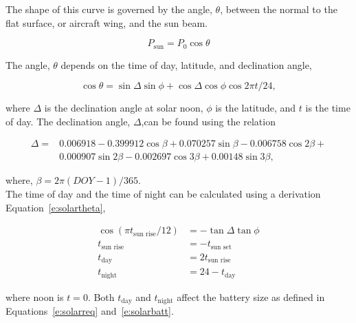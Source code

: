 \documentclass[]{aiaa-tc}%
\begin{document}
The shape of this curve is governed by the angle, $\theta$, between the normal to the flat surface, or aircraft wing, and the sun beam.\cite{solar}

\begin{equation}
    \label{e:solarp}
    P_{\text{sun}} = P_0 \cos{\theta}
\end{equation}

The angle, $\theta$ depends on the time of day, latitude, and declination angle,\cite{solar}

    \begin{equation}
        \label{e:solartheta}
        \cos{\theta} = \sin{\Delta} \sin{\phi} + \cos{\Delta} \cos{\phi} \cos{2\pi t/24},
    \end{equation}

    where $\Delta$ is the declination angle at solar noon, $\phi$ is the latitude, and $t$ is the time of day.\cite{solar}  The declination angle, $\Delta$,can be found using the relation\cite{solar} 

    \begin{align}
        \label{e:solardelta}
        \Delta = &0.006918 - 0.399912 \cos{\beta} + 0.070257\sin{\beta} - 0.006758\cos{2\beta} + \nonumber \\
        & 0.000907\sin{2\beta} - 0.002697\cos{3\beta} + 0.00148\sin{3\beta},
    \end{align}

    where, $\beta = 2\pi (DOY-1)/365$.  \\

    The time of day and the time of night can be calculated using a derivation Equation~\ref{e:solartheta}, \cite{solar}

    \begin{align}
        \label{e:solartday}
        \cos{(\pi t_{\text{sun rise}}/12)} &= -\tan{\Delta} \tan{\phi} \\
        \label{e:solarsunrise}
        t_{\text{sun rise}} &= -t_{\text{sun set}} \\
        \label{e:solartday2}
        t_{\text{day}} &= 2t_{\text{sun rise}} \\
        \label{e:solartnight}
        t_{\text{night}} &= 24 - t_{\text{day}}
    \end{align}

    where noon is $t=0$. Both $t_{\text{day}}$ and $t_{\text{night}}$ affect the battery size as defined in Equations~\ref{e:solarreq} and~\ref{e:solarbatt}. \\
\end{document}

